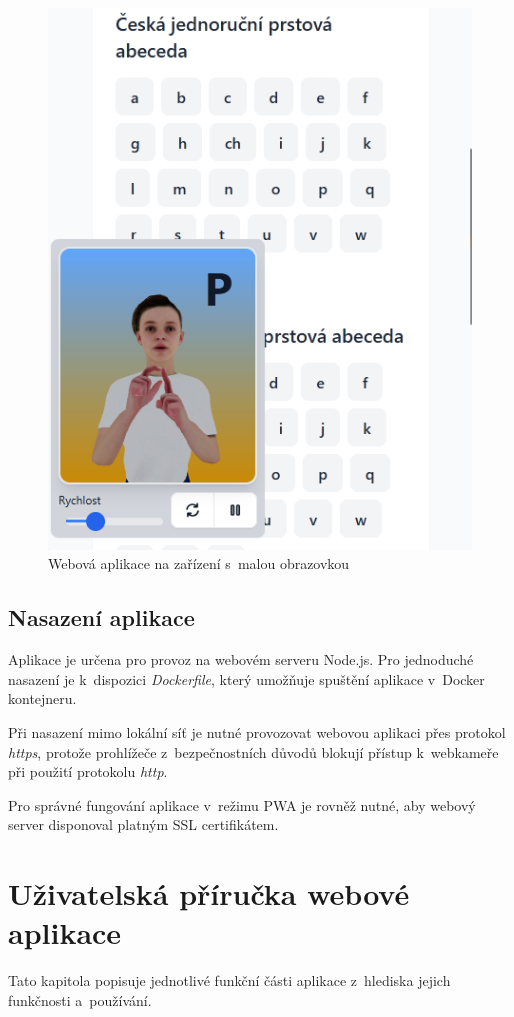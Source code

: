 \documentclass[
  master,
  program=ainfvs,
  biblatex,
  figures=true,
  tables=false,
  sourcecodes=true,
  glossaries,
  index
]{kidiplom}
\begin{document}


        \begin{figure}[H]
            \centering
            \includegraphics[width=0.5\columnwidth]{graphics/mobile.png}
            \caption{Webová aplikace na zařízení s~malou obrazovkou}
            \label{mobile}
        \end{figure}
        
        
    \subsection{Nasazení aplikace}
        Aplikace je určena pro provoz na webovém serveru Node.js. Pro jednoduché nasazení je k~dispozici \emph{Dockerfile}, který umožňuje spuštění aplikace v~Docker kontejneru.
        
        Při nasazení mimo lokální síť je nutné provozovat webovou aplikaci přes protokol \emph{https}, protože prohlížeče z~bezpečnostních důvodů blokují přístup k~webkameře při použití protokolu \emph{http}.
        
        Pro správné fungování aplikace v~režimu PWA je rovněž nutné, aby webový server disponoval platným SSL certifikátem.

\clearpage


\section{Uživatelská příručka webové aplikace}
    Tato kapitola popisuje jednotlivé funkční části aplikace z~hlediska jejich funkčnosti a~používání.
\end{document}
